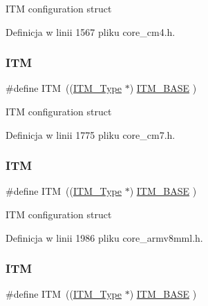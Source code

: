 I\+TM configuration struct 

Definicja w linii 1567 pliku core\+\_\+cm4.\+h.

\mbox{\label{group___c_m_s_i_s__core__base_gabae7cdf882def602cb787bb039ff6a43}} 
\subsubsection{\texorpdfstring{I\+TM}{ITM}\hspace{0.1cm}{\footnotesize\ttfamily [4/6]}}
{\footnotesize\ttfamily \#define I\+TM~((\hyperlink{struct_i_t_m___type}{I\+T\+M\+\_\+\+Type}       $\ast$)     \hyperlink{group___c_m_s_i_s__core__base_gadd76251e412a195ec0a8f47227a8359e}{I\+T\+M\+\_\+\+B\+A\+SE}      )}

I\+TM configuration struct 

Definicja w linii 1775 pliku core\+\_\+cm7.\+h.

\mbox{\label{group___c_m_s_i_s__core__base_gabae7cdf882def602cb787bb039ff6a43}} 
\subsubsection{\texorpdfstring{I\+TM}{ITM}\hspace{0.1cm}{\footnotesize\ttfamily [5/6]}}
{\footnotesize\ttfamily \#define I\+TM~((\hyperlink{struct_i_t_m___type}{I\+T\+M\+\_\+\+Type}       $\ast$)     \hyperlink{group___c_m_s_i_s__core__base_gadd76251e412a195ec0a8f47227a8359e}{I\+T\+M\+\_\+\+B\+A\+SE}         )}

I\+TM configuration struct 

Definicja w linii 1986 pliku core\+\_\+armv8mml.\+h.

\mbox{\label{group___c_m_s_i_s__core__base_gabae7cdf882def602cb787bb039ff6a43}} 
\subsubsection{\texorpdfstring{I\+TM}{ITM}\hspace{0.1cm}{\footnotesize\ttfamily [6/6]}}
{\footnotesize\ttfamily \#define I\+TM~((\hyperlink{struct_i_t_m___type}{I\+T\+M\+\_\+\+Type}       $\ast$)     \hyperlink{group___c_m_s_i_s__core__base_gadd76251e412a195ec0a8f47227a8359e}{I\+T\+M\+\_\+\+B\+A\+SE}         )}

